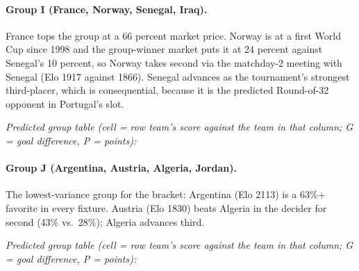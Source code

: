 \documentclass[11pt,letterpaper]{article}
\begin{document}
\paragraph{Group I (France, Norway, Senegal, Iraq).} France tops the group at a 66 percent market price. Norway is at a first World Cup since 1998 and the group-winner market puts it at 24 percent against Senegal's 10 percent, so Norway takes second via the matchday-2 meeting with Senegal (Elo 1917 against 1866). Senegal advances as the tournament's strongest third-placer, which is consequential, because it is the predicted Round-of-32 opponent in Portugal's slot.

\noindent\textit{\footnotesize Predicted group table (cell = row team's score against the team in that column; G = goal difference, P = points):}



\paragraph{Group J (Argentina, Austria, Algeria, Jordan).} The lowest-variance group for the bracket: Argentina (Elo 2113) is a 63\%+ favorite in every fixture. Austria (Elo 1830) beats Algeria in the decider for second (43\% vs.\ 28\%); Algeria advances third.

\noindent\textit{\footnotesize Predicted group table (cell = row team's score against the team in that column; G = goal difference, P = points):}

\end{document}
